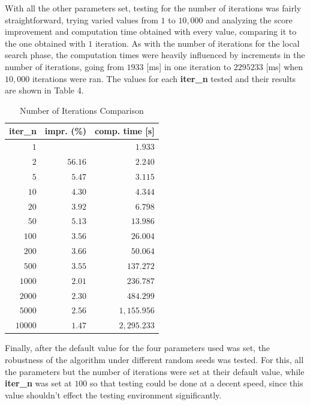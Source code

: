 With all the other parameters set, testing for the number of iterations was fairly straightforward, trying varied values from $1$ to $10,000$ and analyzing the score improvement and computation time obtained with every value, comparing it to the one obtained with $1$ iteration. As with the number of iterations for the local search phase, the computation times were heavily influenced by increments in the number of iterations, going from $1933$ [ms] in one iteration to $2295233$ [ms] when $10,000$ iterations were ran. The values for each \textbf{iter\_n} tested and their results are shown in Table 4.

\begin{center}
    \begin{table}[]
    \centering
    \begin{tabular}{|r|r|r|}
        \hline
        \textbf{iter\_n} & impr. (\%) & comp. time [s] \\
        \hline
        $1$     &         &     $1.933$ \\
        $2$     & $56.16$ &     $2.240$ \\
        $5$     &  $5.47$ &     $3.115$ \\
        $10$    &  $4.30$ &     $4.344$ \\
        $20$    &  $3.92$ &     $6.798$ \\
        $50$    &  $5.13$ &    $13.986$ \\
        $100$   &  $3.56$ &    $26.004$ \\
        $200$   &  $3.66$ &    $50.064$ \\
        $500$   &  $3.55$ &   $137.272$ \\
        $1000$  &  $2.01$ &   $236.787$ \\
        $2000$  &  $2.30$ &   $484.299$ \\
        $5000$  &  $2.56$ & $1,155.956$ \\
        $10000$ &  $1.47$ & $2,295.233$ \\
        \hline
    \end{tabular}
    \caption{Number of Iterations Comparison}
    \label{iter\_n comparison}
    \end{table}
\end{center}

Finally, after the default value for the four parameters used was set, the robustness of the algorithm under different random seeds was tested. For this, all the parameters but the number of iterations were set at their default value, while \textbf{iter\_n} was set at $100$ so that testing could be done at a decent speed, since this value shouldn't effect the testing environment significantly.

